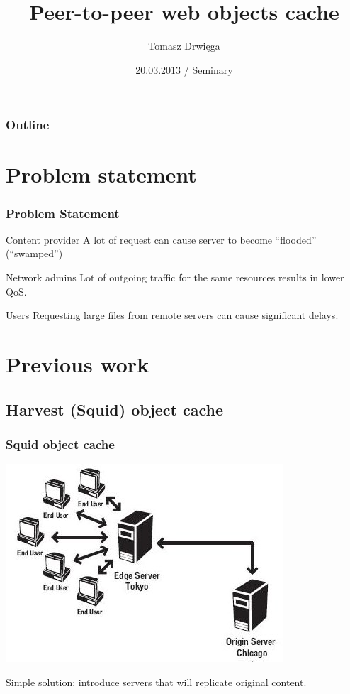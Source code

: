 \documentclass{beamer}
\title{Peer-to-peer web objects cache}
\author{Tomasz Drwięga}
\date{20.03.2013 / Seminary}
\begin{document}
\begin{frame}
\titlepage
\end{frame}

\begin{frame}
\frametitle{Outline}
\tableofcontents
\end{frame}


\section{Problem statement}

\begin{frame}
\frametitle{Problem Statement}

\begin{block}{Content provider}
A lot of request can cause server to become ``flooded'' (``swamped'')
\end{block}
\pause
\begin{block}{Network admins}
Lot of outgoing traffic for the same resources results in lower QoS.
\end{block}
\pause
\begin{block}{Users}
Requesting large files from remote servers can cause significant delays.
\end{block}
\end{frame}


\section{Previous work}
\subsection{Harvest (Squid) object cache}

\begin{frame}
\frametitle{Squid object cache}

\includegraphics[width=0.8\linewidth]{media_server2_edge.jpg}

\begin{block}{}
Simple solution: introduce servers that will replicate original content.
\end{block}

\end{frame}
\end{document}
